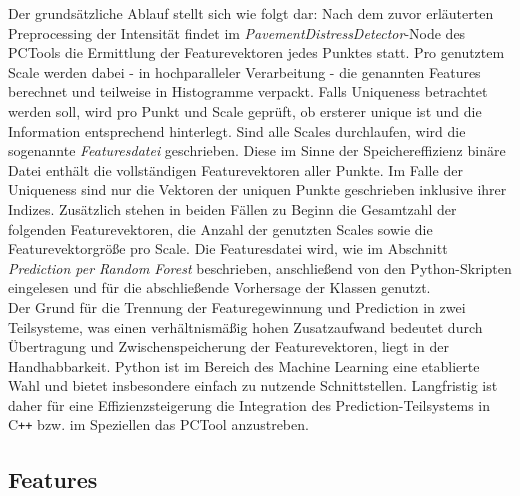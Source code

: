 Der grundsätzliche Ablauf stellt sich wie folgt dar: Nach dem zuvor erläuterten Preprocessing der Intensität findet im \textit{PavementDistressDetector}-Node des PCTools die Ermittlung der Featurevektoren jedes Punktes statt. Pro genutztem Scale werden dabei - in hochparalleler Verarbeitung - die genannten Features berechnet und teilweise in Histogramme verpackt. Falls Uniqueness betrachtet werden soll, wird pro Punkt und Scale geprüft, ob ersterer unique ist und die Information entsprechend hinterlegt. Sind alle Scales durchlaufen, wird die sogenannte \textit{Featuresdatei} geschrieben. Diese im Sinne der Speichereffizienz binäre Datei enthält die vollständigen Featurevektoren aller Punkte. Im Falle der Uniqueness sind nur die Vektoren der uniquen Punkte geschrieben inklusive ihrer Indizes. Zusätzlich stehen in beiden Fällen zu Beginn die Gesamtzahl der folgenden Featurevektoren, die Anzahl der genutzten Scales sowie die Featurevektorgröße pro Scale. Die Featuresdatei wird, wie im Abschnitt \textit{Prediction per Random Forest} beschrieben, anschließend von den Python-Skripten eingelesen und für die abschließende Vorhersage der Klassen genutzt. \\
Der Grund für die Trennung der Featuregewinnung und Prediction in zwei Teilsysteme, was einen verhältnismäßig hohen Zusatzaufwand bedeutet durch Übertragung und Zwischenspeicherung der Featurevektoren, liegt in der Handhabbarkeit. Python ist im Bereich des Machine Learning eine etablierte Wahl und bietet insbesondere einfach zu nutzende Schnittstellen. Langfristig ist daher für eine Effizienzsteigerung die Integration des Prediction-Teilsystems in C\texttt{++} bzw. im Speziellen das PCTool anzustreben. 

\subsection{Features} 

